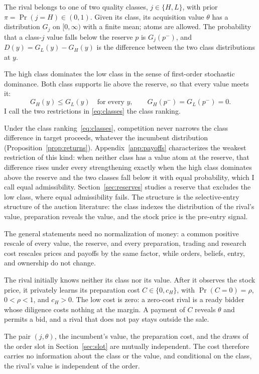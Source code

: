 The rival belongs to one of two quality classes, \(j\in\{H,L\}\), with prior \(\pi=\Pr(j=H)\in(0,1)\).
Given its class, its acquisition value \(\theta\) has a distribution \(G_j\) on \([0,\infty)\) with a finite
mean; atoms are allowed. The probability that a class-\(j\) value falls below the reserve \(p\) is
\(G_j(p^-)\), and \(D(y)=G_L(y)-G_H(y)\) is the difference between the two class distributions at \(y\).

The high class dominates the low class in the sense of first-order stochastic
dominance. Both class supports lie above the reserve, so that every value meets it:
\begin{equation}\label{eq:classes}
G_H(y)\le G_L(y)\quad\text{for every }y,\qquad G_H(p^-)=G_L(p^-)=0.
\end{equation}
I call the two restrictions in \eqref{eq:classes} the class ranking.

Under the class ranking~\eqref{eq:classes}, competition never narrows the class difference in target proceeds,
whatever the incumbent distribution (Proposition~\ref{prop:returns}). Appendix~\ref{app:payoffs} characterizes the
weakest restriction of this kind: when neither class has a value atom at the reserve, that
difference rises under every strengthening exactly when the high class dominates above the reserve and the two
classes fall below it with equal probability, which I call equal admissibility.
Section~\ref{sec:reserves} studies a reserve that excludes the low class, where equal admissibility fails.
The structure is the selective-entry structure of the auction literature: the class indexes the distribution
of the rival's value, preparation reveals the value, and the stock price is the pre-entry signal.

The general statements need no normalization of money: a common positive rescale of every value, the reserve,
and every preparation, trading and research cost rescales prices and payoffs by the same factor, while
orders, beliefs, entry, and ownership do not change.

The rival initially knows neither its class nor its value. After it observes the stock price, it
privately learns its preparation cost \(C\in\{0,c_H\}\), with \(\Pr(C=0)=\rho\), \(0<\rho<1\), and
\(c_H>0\). The low cost is zero: a zero-cost rival is a ready bidder whose diligence costs nothing at the
margin. A payment of \(C\) reveals \(\theta\) and permits a bid, and a rival that does not pay stays
outside the sale.

The pair \((j,\theta)\), the incumbent's value, the preparation cost, and the draws of the order slot in
Section~\ref{sec:slot} are mutually independent. The cost therefore carries no information about the class
or the value, and conditional on the class, the rival's value is independent of the order.

